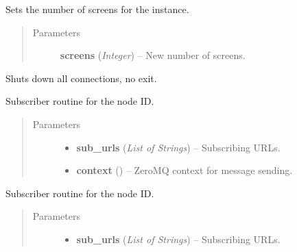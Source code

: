 \documentclass[letterpaper,10pt,english]{sphinxmanual}
\begin{document}
\begin{fulllineitems}
\begin{fulllineitems}
\label{swnp:swnp.SWNP.set_screens}
Sets the number of screens for the instance.
\begin{quote}\begin{description}
\item[{Parameters}] \leavevmode
\textbf{screens} (\emph{Integer}) -- New number of screens.

\end{description}\end{quote}

\end{fulllineitems}


\begin{fulllineitems}
\label{swnp:swnp.SWNP.shutdown}
Shuts down all connections, no exit.

\end{fulllineitems}


\begin{fulllineitems}
\label{swnp:swnp.SWNP.sub_routine}
Subscriber routine for the node ID.
\begin{quote}\begin{description}
\item[{Parameters}] \leavevmode\begin{itemize}
\item {} 
\textbf{sub\_urls} (\emph{List of Strings}) -- Subscribing URLs.

\item {} 
\textbf{context} () -- ZeroMQ context for message sending.

\end{itemize}

\end{description}\end{quote}

\end{fulllineitems}


\begin{fulllineitems}
\label{swnp:swnp.SWNP.sub_routine_sys}
Subscriber routine for the node ID.
\begin{quote}\begin{description}
\item[{Parameters}] \leavevmode\begin{itemize}
\item {} 
\textbf{sub\_urls} (\emph{List of Strings}) -- Subscribing URLs.


\end{itemize}
\end{description}
\end{quote}
\end{fulllineitems}
\end{fulllineitems}
\end{document}
